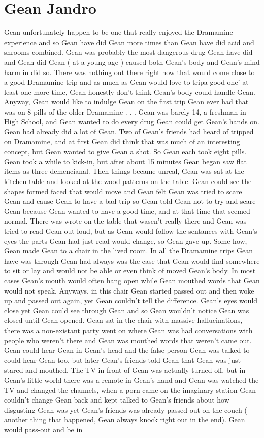 \documentclass[12pt]{book}
\begin{document}
\chapter{Gean Jandro}

Gean unfortunately happen to be one that really enjoyed the Dramamine experience and so Gean have did Gean more times than Gean have did acid and shrooms combined. Gean was probably the most dangerous drug Gean have did and Gean did Gean ( at a young age ) caused both Gean's body and Gean's mind harm in did so. There was nothing out there right now that would come close to a good Dramamine trip and as much as Gean would love to tripa good one' at least one more time, Gean honestly don't think Gean's body could handle Gean. Anyway, Gean would like to indulge Gean on the first trip Gean ever had that was on 8 pills of the older Dramamine . . .  Gean was barely 14, a freshman in High School, and Gean wanted to do every drug Gean could get Gean's hands on. Gean had already did a lot of Gean. Two of Gean's friends had heard of tripped on Dramamine, and at first Gean did think that was much of an interesting concept, but Gean wanted to give Gean a shot. So Gean each took eight pills. Gean took a while to kick-in, but after about 15 minutes Gean began saw flat items as three demencianal. Then things became unreal, Gean was sat at the kitchen table and looked at the wood patterns on the table. Gean could see the shapes formed faced that would move and Gean felt Gean was tried to scare Gean and cause Gean to have a bad trip so Gean told Gean not to try and scare Gean because Gean wanted to have a good time, and at that time that seemed normal. There was wrote on the table that wasen't really there and Gean was tried to read Gean out loud, but as Gean would follow the sentances with Gean's eyes the parts Gean had just read would change, so Gean gave-up. Some how, Gean made Gean to a chair in the lived room. In all the Dramamine trips Gean have was through Gean had always was the case that Gean would find somewhere to sit or lay and would not be able or even think of moved Gean's body. In most cases Gean's mouth would often hang open while Gean mouthed words that Gean would not speak. Anyways, in this chair Gean started passed out and then woke up and passed out again, yet Gean couldn't tell the difference. Gean's eyes would close yet Gean could see through Gean and so Gean wouldn't notice Gean was closed until Gean opened. Gean sat in the chair with massive hallucinations, there was a non-existant party went on where Gean was had conversations with people who weren't there and Gean was mouthed words that weren't came out. Gean could hear Gean in Gean's head and the false person Gean was talked to could hear Gean too, but later Gean's friends told Gean that Gean was just stared and mouthed. The TV in front of Gean was actually turned off, but in Gean's little world there was a remote in Gean's hand and Gean was watched the TV and changed the channels, when a porn came on the imaginary station Gean couldn't change Gean back and kept talked to Gean's friends about how disgusting Gean was yet Gean's friends was already passed out on the couch ( another thing that happened, Gean always knock right out in the end). Gean would pass-out and be in 
\end{document}
